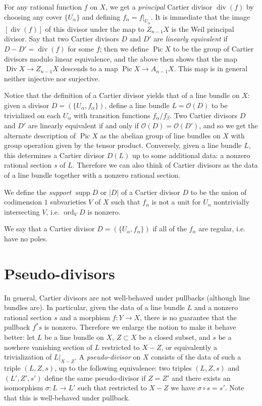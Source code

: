 \documentclass[leqno, openany]{memoir}
\theoremstyle{definition}
\theoremstyle{remark}
\theoremstyle{plain}
\theoremstyle{definition}
\theoremstyle{remark}
\newcommand{\mc}[1]{\mathcal{#1}}
\renewcommand{\div}{\operatorname{div}}
\DeclareMathOperator{\Pic}{Pic}
\DeclareMathOperator{\supp}{supp}
\DeclareMathOperator{\ord}{ord}
\DeclareMathOperator{\Div}{Div}
\begin{document}
For any rational function $f$ on $X$, we get a \textit{principal} Cartier
divisor $\div(f)$ by choosing any cover $\{U_\alpha\}$ and defining $f_\alpha =
f|_{U_\alpha}$. It is immediate that the image $[\div(f)]$ of this divisor
under the map to $Z_{n-1}X$ is the Weil principal divisor. Say that two Cartier
divisors $D$ and $D'$ are \textit{linearly equivalent} if $D - D' = \div(f)$
for some $f$; then we define $\Pic X$ to be the group of Cartier divisors
modulo linear equivalence, and the above then shows that the map $\Div X \to
Z_{n-1} X$ descends to a map $\Pic X \to A_{n-1} X$. This map is in general
neither injective nor surjective.

Notice that the definition of a Cartier divisor yields that of a line bundle on
$X$: given a divisor $D = (\{U_\alpha, f_\alpha\})$, define a line bundle $L =
\mc{O}(D)$ to be trivialized on each $U_\alpha$ with transition functions
$f_\alpha/f_\beta$. Two Cartier divisors $D$ and $D'$ are linearly equivalent
if and only if $\mc{O}(D) = \mc{O}(D')$, and so we get the alternate
description of $\Pic X$ as the abelian group of line bundles on $X$ with group
operation given by the tensor product. Conversely, given a line bundle $L$,
this determines a Cartier divisor $D(L)$ up to some additional data: a nonzero
rational section $s$ of $L$. Therefore we can also think of Cartier divisors as
the data of a line bundle together with a nonzero rational section.

We define the \textit{support} $\supp D$ or $|D|$ of a Cartier divisor $D$ to
be the union of codimension $1$ subvarieties $V$ of $X$ such that $f_\alpha$ is
not a unit for $U_\alpha$ nontrivially intersecting $V$, i.e. $\ord_V D$ is
nonzero.

We say that a Cartier divisor $D = (\{U_\alpha, f_\alpha\})$ if all of the
$f_\alpha$ are regular, i.e. have no poles.

\section{Pseudo-divisors} In general, Cartier divisors are not well-behaved
under pullbacks (although line bundles are). In particular, given the data of a
line bundle $L$ and a nonzero rational section $s$ and a morphism $f\colon Y
\to X$, there is no guarantee that the pullback $f^* s$ is nonzero. Therefore
we enlarge the notion to make it behave better: let $L$ be a line bundle on
$X$, $Z \subset X$ be a closed subset, and $s$ be a nowhere vanishing section
of $L$ restricted to $X-Z$, or equivalently a trivialization of $L|_{X-Z}$. A
\textit{pseudo-divisor} on $X$ consists of the data of such a triple $(L,Z,s)$,
up to the following equivalence: two triples $(L,Z,s)$ and $(L',Z',s')$ define
the same pseudo-divisor if $Z = Z'$ and there exists an isomorphism
$\sigma\colon L \to L'$ such that restricted to $X-Z$ we have $\sigma \circ s =
s'$. Note that this is well-behaved under pullback.
\end{document}
